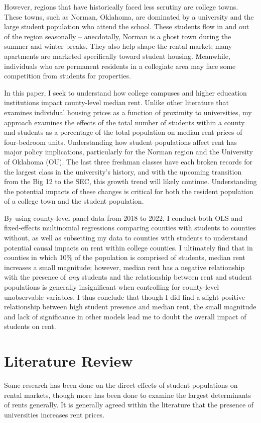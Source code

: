 \documentclass[12pt,english]{article}
\begin{document}
However, regions that have historically faced less scrutiny are college towns. These towns, such as Norman, Oklahoma, are dominated by a university and the large student population who attend the school. These students flow in and out of the region seasonally – anecdotally, Norman is a ghost town during the summer and winter breaks. They also help shape the rental market; many apartments are marketed specifically toward student housing. Meanwhile, individuals who are permanent residents in a collegiate area may face some competition from students for properties.

In this paper, I seek to understand how college campuses and higher education institutions impact county-level median rent. Unlike other literature that examines individual housing prices as a function of proximity to universities, my approach examines the effects of the total number of students within a county and students as a percentage of the total population on median rent prices of four-bedroom units. Understanding how student populations affect rent has major policy implications, particularly for the Norman region and the University of Oklahoma (OU). The last three freshman classes have each broken records for the largest class in the university’s history, and with the upcoming transition from the Big 12 to the SEC, this growth trend will likely continue. Understanding the potential impacts of these changes is critical for both the resident population of a college town and the student population. 

By using county-level panel data from 2018 to 2022, I conduct both OLS and fixed-effects multinomial regressions comparing counties with students to counties without, as well as subsetting my data to counties with students to understand potential causal impacts on rent within college counties. I ultimately find that in counties in which 10\% of the population is comprised of students, median rent increases a small magnitude; however, median rent has a negative relationship with the presence of \textit{any} students and the relationship between rent and student populations is generally insignificant when controlling for county-level unobservable variables. I thus conclude that though I did find a slight positive relationship between high student presence and median rent, the small magnitude and lack of significance in other models lead me to doubt the overall impact of students on rent. 

\section{Literature Review}\label{sec:litreview}
Some research has been done on the direct effects of student populations on rental markets, though more has been done to examine the largest determinants of rents generally. It is generally agreed within the literature that the presence of universities increases rent prices.
\end{document}
